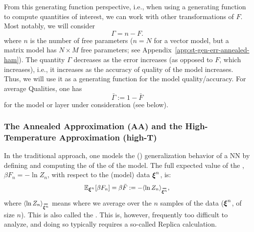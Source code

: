 From this generating function perspective, i.e., when using a generating function to compute quantities of interest, we can work with other transformations of $F$.
Most notably, we will consider 
\begin{equation}
    \Gamma = n-F .
\end{equation}
where $n$ is the number of free parameters ($n=N$ for a vector model, but a matrix model has $N\times M$ free parameters; see Appendix~\ref{app:st-gen-err-annealed-ham}).
The quantity $\Gamma$ decreases as the error increases (as opposed to $F$, which increases), i.e., it increases as the accuracy of quality of the model increases.
Thus, we will use it as a generating function for the model quality/accuracy.
For average Qualities, one has
\begin{equation} 
\label{eqn:GammaBar}
 \bar{\Gamma}:=1-\bar{F}
\end{equation} %
for the model or layer under consideration (see below).


\subsubsection{The Annealed Approximation (AA) and the High-Temperature Approximation (high-T)}
\label{sxn:mathP_annealed}

In the traditional \SMOG approach, one models the (\Typical) generalization behavior of a NN
by defining and computing the \ExpectedValue of the \FreeEnergy of the model.
The full expected value  of the \FreeEnergy, $\beta F_{n}=-\ln Z_{n}$, with respect to the (model) data $\boldsymbol{\xi}^{n}$, is:
\begin{align}
\label{eqn:mm_f_bar}
  \mathbb{E}_{\NDXIn}[\beta F_n]=\beta\bar{F}:=-\langle \ln Z_{n}\rangle_{\AVGNDXIn},
\end{align}
where $\langle \ln Z_{n}\rangle_{\AVGNDXIn}$ means where we average over  the $n$ samples of the data ($\boldsymbol{\xi}^{n}$, of size $n$).  This is also called the \Quenched \FreeEnergy.
This is, however,  frequently too difficult to analyze, and doing so typically
requires a so-called Replica calculation. 

